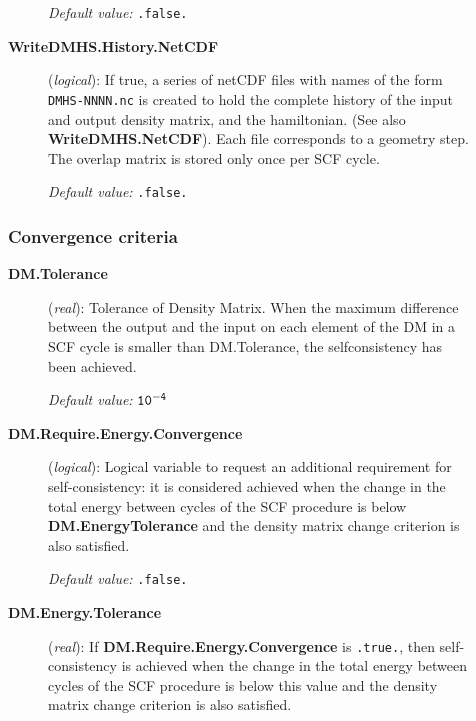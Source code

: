 \documentclass[11pt]{article}
\begin{document}
\begin{description}
\begin{description}
{\it Default value:} {\tt .false.}

\item[{\bf WriteDMHS.History.NetCDF}] ({\it logical}):
 If true, a series of netCDF
files with names of the form {\tt DMHS-NNNN.nc} is created to hold the
complete history of the input and output density matrix, and the
hamiltonian.  (See also {\bf WriteDMHS.NetCDF}). Each file corresponds
to a geometry step. The overlap matrix is stored only once per SCF
cycle.

{\it Default value:} {\tt .false.}

\end{description}
\subsubsection{Convergence criteria}

\begin{description}
\item[{\bf DM.Tolerance}] ({\it real}): 
Tolerance of Density Matrix.
When the maximum difference between the output and the
input on each element of the DM 
in a SCF cycle is smaller than DM.Tolerance,
the selfconsistency has been achieved.

{\it Default value:} {${\tt 10^{-4}}$}



\item[{\bf DM.Require.Energy.Convergence}] ({\it logical}):
Logical variable to request an additional requirement for
self-consistency: it is considered achieved when the change in the total energy between cycles
of the SCF procedure is below {\bf DM.EnergyTolerance} and the
density matrix change criterion is also satisfied.

{\it Default value:} {\tt .false.}

\item[{\bf DM.Energy.Tolerance}] ({\it real}): 
If {\bf DM.Require.Energy.Convergence} is {\tt .true.}, then
self-consistency is achieved when the change in the total energy between cycles
of the SCF procedure is below this value and the
density matrix change criterion is also satisfied.


\end{description}
\end{description}
\end{document}
